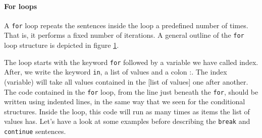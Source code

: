 \begin{paracol}{2}
\paragraph{For loops}  A \texttt{for} loop repeats the sentences inside the loop a predefined number of times. That is, it performs a fixed number of iterations. A general outline of the \texttt{for} loop structure is depicted in figure \ref{fig:for}.

The loop starts with the keyword \texttt{for} followed by a variable we have called
index. After, we write the keyword \texttt{in}, a list of values and a colon :. The index (variable) will take all values contained in the [list of values] one after another. The code contained in the \texttt{for} loop, from the line just beneath the \texttt{for}, should be written using indented lines, in the same way that we seen for the conditional structures. Inside the loop, this code will run as many times as items the list of values has. Let's have a look at some examples before describing the \texttt{break} and \texttt{continue} sentences.  
\end{paracol}
\begin{figure}
\centering
{}
\label{fig:for}
\end{figure} 


